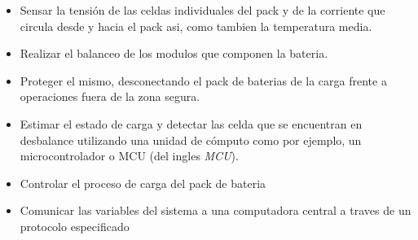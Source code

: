 \documentclass[10pt,a4paper]{article}
\begin{document}
	\begin{itemize}
		\item Sensar la tensión de las celdas individuales del pack y de la 
        corriente que circula desde y hacia el pack asi, como tambien 
        la temperatura media.
		\item Realizar el balanceo de los modulos que componen la bateria.
		\item Proteger el mismo, desconectando el pack de baterias de la carga
            frente a operaciones fuera de la zona segura.
		\item Estimar el estado de carga y detectar las celda que se encuentran
            en desbalance utilizando una unidad de cómputo como por ejemplo, un
            microcontrolador o \acrshort{MCU} (del ingles \emph{\acrlong{MCU}}).
        \item Controlar el proceso de carga del pack de bateria
        \item Comunicar las variables del sistema a una computadora central a
        traves de un protocolo especificado
	\end{itemize}
	
\end{document}
